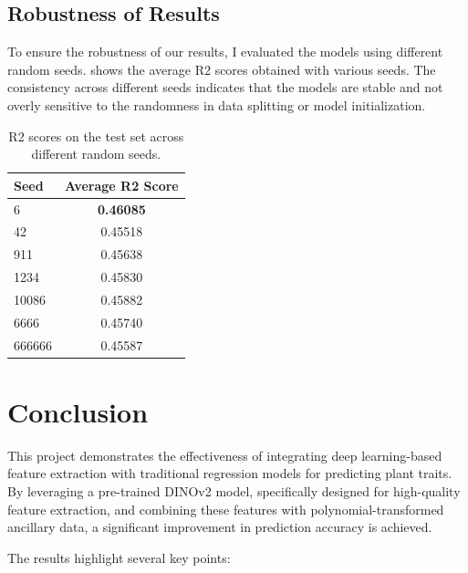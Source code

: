 \documentclass{article}
\begin{document}
\subsection{Robustness of Results}
To ensure the robustness of our results, I evaluated the models using different random seeds.  shows the average R2 scores obtained with various seeds. The consistency across different seeds indicates that the models are stable and not overly sensitive to the randomness in data splitting or model initialization.

\begin{table}[h]
	\centering
	\caption{R2 scores on the test set across different random seeds.}
	\begin{tabular}{lc}
		\toprule
		Seed   & Average R2 Score \\
		\midrule
		6      & \textbf{0.46085} \\
		42     & 0.45518          \\
		911    & 0.45638          \\
		1234   & 0.45830          \\
		10086  & 0.45882          \\
		6666   & 0.45740          \\
		666666 & 0.45587          \\
		\bottomrule
	\end{tabular}
	\label{tab:r2-scores-across-seeds}
\end{table}


\section{Conclusion}
This project demonstrates the effectiveness of integrating deep learning-based feature extraction with traditional regression models for predicting plant traits. By leveraging a pre-trained DINOv2 model, specifically designed for high-quality feature extraction, and combining these features with polynomial-transformed ancillary data, a significant improvement in prediction accuracy is achieved.

The results highlight several key points:
\end{document}
